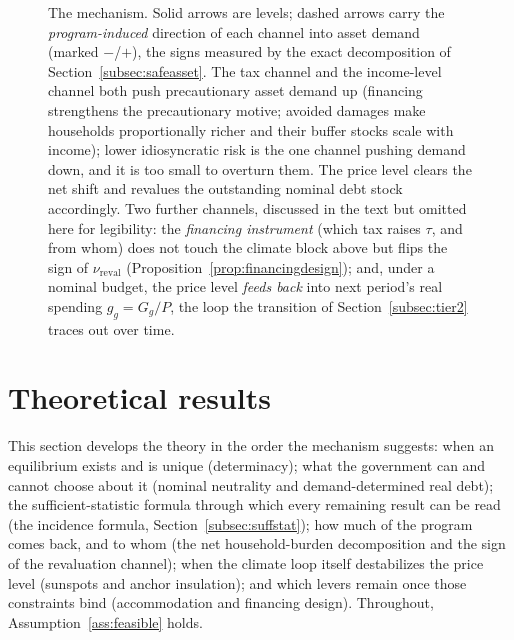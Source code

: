 \documentclass[12pt]{article}
\begin{document}
\begin{figure}[H]
\caption{The mechanism. Solid arrows are levels; dashed arrows carry the
\emph{program-induced} direction of each channel into asset demand
(marked $-$/$+$), the signs measured by the exact decomposition of
Section~\ref{subsec:safeasset}. The tax channel and the income-level
channel both push precautionary asset demand up (financing
strengthens the precautionary motive; avoided damages make households
proportionally richer and their buffer stocks scale with income); lower
idiosyncratic risk is the one channel pushing demand down, and it
is too small to overturn them. The price level clears the net shift and
revalues the outstanding nominal debt stock accordingly. Two further
channels, discussed in the text but omitted
here for legibility: the \emph{financing instrument} (which tax raises
$\tau$, and from whom) does not touch the climate block above but flips
the sign of $\nu_{\mathrm{reval}}$ (Proposition~\ref{prop:financingdesign});
and, under a nominal budget, the price level \emph{feeds back} into next
period's real spending $g_g=G_g/P$, the loop the transition of
Section~\ref{subsec:tier2} traces out over time.}
\label{fig:mechanism}
\end{figure}

\section{Theoretical results}\label{sec:theory}

This section develops the theory in the order the mechanism suggests: when
an equilibrium exists and is unique (determinacy); what the government can
and cannot choose about it (nominal neutrality and demand-determined real
debt); the sufficient-statistic formula through which every remaining
result can be read (the incidence formula,
Section~\ref{subsec:suffstat}); how much of the program comes back, and to
whom (the net household-burden decomposition and the sign of the revaluation
channel); when the climate loop itself destabilizes the price level
(sunspots and anchor insulation); and which levers remain once those
constraints bind (accommodation and financing design). Throughout,
Assumption~\ref{ass:feasible} holds.
\end{document}
